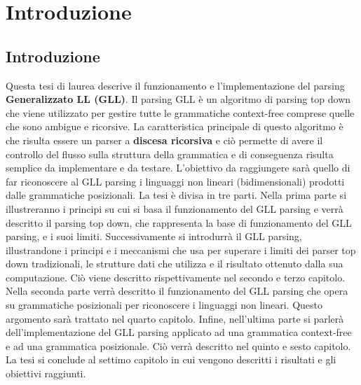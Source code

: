 \chapter{Introduzione}
\section{Introduzione}
Questa tesi di laurea descrive il funzionamento e l'implementazione del parsing \textbf{Generalizzato LL (GLL)}. Il parsing GLL è un algoritmo di parsing top down che viene utilizzato per gestire tutte le grammatiche context-free comprese quelle che sono ambigue e ricorsive. La caratteristica principale di questo algoritmo è che risulta essere un parser a \textbf{discesa ricorsiva} e ciò permette di avere il controllo del flusso sulla struttura della grammatica e di conseguenza risulta semplice da implementare e da testare. L'obiettivo da raggiungere sarà quello di far riconoscere al GLL parsing i linguaggi non lineari (bidimensionali) prodotti dalle grammatiche posizionali. La tesi è divisa in tre parti. Nella prima parte si illustreranno i principi su cui si basa il funzionamento del GLL parsing e verrà descritto il parsing top down, che rappresenta la base di funzionamento del GLL parsing, e i suoi limiti. Successivamente si introdurrà il GLL parsing, illustrandone i principi e i meccanismi che usa per superare i limiti dei parser top down tradizionali, le strutture dati che utilizza e il risultato ottenuto dalla sua computazione. Ciò viene descritto rispettivamente nel secondo e terzo capitolo. Nella seconda parte verrà descritto il funzionamento del GLL parsing che opera su grammatiche posizionali per riconoscere i linguaggi non lineari. Questo argomento sarà trattato nel quarto capitolo. Infine, nell'ultima parte si parlerà dell'implementazione del GLL parsing applicato ad una grammatica context-free e ad una grammatica posizionale. Ciò verrà descritto nel quinto e sesto capitolo. La tesi si conclude al settimo capitolo in cui vengono descritti i risultati e gli obiettivi raggiunti.